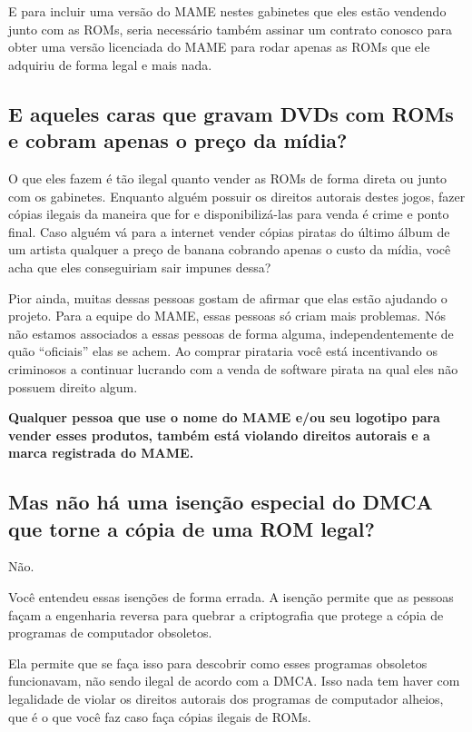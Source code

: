 \documentclass[letterpaper,10pt,brazil]{sphinxmanual}
\begin{document}
E para incluir uma versão do MAME nestes gabinetes que eles estão
vendendo junto com as ROMs, seria necessário também assinar um contrato
conosco para obter uma versão licenciada do MAME para rodar apenas as
ROMs que ele adquiriu de forma legal e mais nada.


\subsection{E aqueles caras que gravam DVDs com ROMs e cobram apenas o preço da mídia?}
\label{usingmame/commonissues:rom-dvds}\label{usingmame/commonissues:e-aqueles-caras-que-gravam-dvds-com-roms-e-cobram-apenas-o-preco-da-midia}
O que eles fazem é tão ilegal quanto vender as ROMs de forma direta ou
junto com os gabinetes. Enquanto alguém possuir os direitos autorais
destes jogos, fazer cópias ilegais da maneira que for e
disponibilizá-las para venda é crime e ponto final. Caso alguém vá para
a internet vender cópias piratas do último álbum de um artista qualquer
a preço de banana cobrando apenas o custo da mídia, você acha que eles
conseguiriam sair impunes dessa?

Pior ainda, muitas dessas pessoas gostam de afirmar que elas estão
ajudando o projeto. Para a equipe do MAME, essas pessoas só criam mais
problemas. Nós não estamos associados a essas pessoas de forma
alguma, independentemente de quão ``oficiais'' elas se achem.
Ao comprar pirataria você está incentivando os criminosos a continuar
lucrando com a venda de software pirata na qual eles não possuem direito
algum.

\textbf{Qualquer pessoa que use o nome do MAME e/ou seu logotipo para vender
esses produtos, também está violando direitos autorais e a marca
registrada do MAME.}


\subsection{Mas não há uma isenção especial do DMCA que torne a cópia de uma ROM legal?}
\label{usingmame/commonissues:dmca-exemption}\label{usingmame/commonissues:mas-nao-ha-uma-isencao-especial-do-dmca-que-torne-a-copia-de-uma-rom-legal}
Não.

Você entendeu essas isenções de forma errada. A isenção permite que as
pessoas façam a engenharia reversa para quebrar a criptografia que
protege a cópia de programas de computador obsoletos.

Ela permite que se faça isso para descobrir como esses programas
obsoletos funcionavam, não sendo ilegal de acordo com a DMCA.
Isso nada tem haver com legalidade de violar os direitos autorais dos
programas de computador alheios, que é o que você faz caso faça cópias
ilegais de ROMs.
\end{document}
